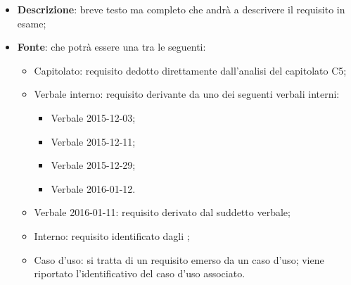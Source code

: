 \begin{itemize}
	\item \textbf{Descrizione}: breve testo ma completo che andrà a descrivere il requisito in esame;
	\item \textbf{Fonte}: che potrà essere una tra le seguenti:
	\begin{itemize}
		\item Capitolato: requisito dedotto direttamente dall'analisi del capitolato C5;
		\item Verbale interno: requisito derivante da uno dei seguenti verbali interni:
		\begin{itemize}
		\item Verbale 2015-12-03;
		\item Verbale 2015-12-11;
		\item Verbale 2015-12-29;
		\item Verbale 2016-01-12.
		\end{itemize}
		\item Verbale 2016-01-11: requisito derivato dal suddetto verbale;
		\item Interno: requisito identificato dagli \textit{\Anas};
		\item Caso d’uso: si tratta di un requisito emerso da un caso d’uso; viene riportato l’identificativo del caso d’uso associato.
	\end{itemize} 
\end{itemize}
%



